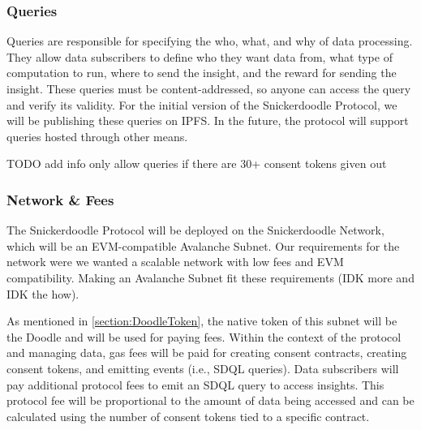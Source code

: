 \subsubsection{Queries}
Queries are responsible for specifying the who, what, and why of data processing. They allow data subscribers to define who they want data from, what type of computation to run, where to send the insight, and the reward for sending the insight. These queries must be content-addressed, so anyone can access the query and verify its validity. For the initial version of the Snickerdoodle Protocol, we will be publishing these queries on IPFS. In the future, the protocol will support queries hosted through other means.

TODO add info only allow queries if there are 30+ consent tokens given out

\subsubsection{Network \& Fees}

The Snickerdoodle Protocol will be deployed on the Snickerdoodle Network, which will be an EVM-compatible Avalanche Subnet. Our requirements for the network were we wanted a scalable network with low fees and EVM compatibility. Making an Avalanche Subnet fit these requirements (IDK more and IDK the how).

As mentioned in \ref{section:DoodleToken}, the native token of this subnet will be the Doodle and will be used for paying fees. Within the context of the protocol and managing data, gas fees will be paid for creating consent contracts, creating consent tokens, and emitting events (i.e., SDQL queries). Data subscribers will pay additional protocol fees to emit an SDQL query to access insights. This protocol fee will be proportional to the amount of data being accessed and can be calculated using the number of consent tokens tied to a specific contract.

